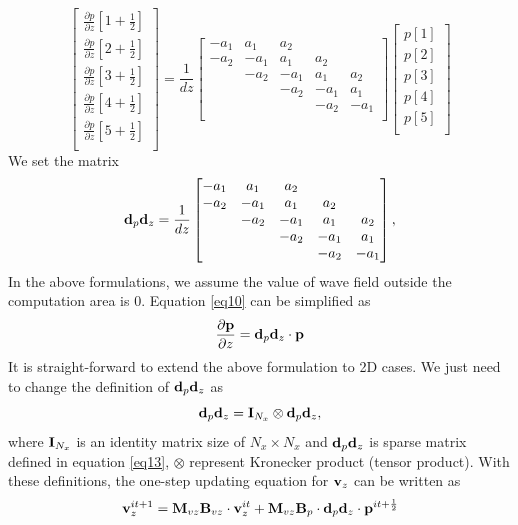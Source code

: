 \documentclass[revised,endfloat]{geophysics}
\begin{document}
\begin{equation}
\begin{bmatrix}
\frac{\partial p}{\partial z}[1+\frac{1}{2}] \\
\frac{\partial p}{\partial z}[2+\frac{1}{2}] \\
\frac{\partial p}{\partial z}[3+\frac{1}{2}] \\
\frac{\partial p}{\partial z}[4+\frac{1}{2}] \\
\frac{\partial p}{\partial z}[5+\frac{1}{2}] \\
\end{bmatrix}
= \frac{1}{dz} \begin{bmatrix}
-a_1 & a_1 & a_2 & & \\
-a_2 & -a_1 & a_1 & a_2 & \\
& -a_2 & -a_1 & a_1 & a_2 \\
& & -a_2 & -a_1 & a_1 \\
& & & -a_2 & -a_1 \\
\end{bmatrix}
\begin{bmatrix}
p[1] \\
p[2] \\
p[3] \\
p[4] \\
p[5] \\
\end{bmatrix}
\label{eq10}
\end{equation}
We set the matrix 
\begin{equation}
{\bf d}_p {\bf d}_z = \frac{1}{dz} \begin{bmatrix}
-a_1 & a_1 & a_2 & & \\
-a_2 & -a_1 & a_1 & a_2 & \\
& -a_2 & -a_1 & a_1 & a_2 \\
& & -a_2 & -a_1 & a_1 \\
& & & -a_2 & -a_1 \\
\end{bmatrix},
\label{eq11}
\end{equation}
In the above formulations, we assume the value of wave field outside the computation area is $0$. Equation \ref{eq10} can be simplified as
\begin{equation}
\frac{\partial {\bf p}}{\partial z} = {\bf d}_p {\bf d}_z \cdot {\bf p}
\label{eq12}
\end{equation}
It is straight-forward to extend the above formulation to 2D cases. We just need to change the definition of ${\bf d}_p{\bf d}_z$ as
\begin{equation}
{\bf d}_p{\bf d}_z = {\bf I}_{N_x} \otimes {\bf d}_p {\bf d}_z, 
\label{eq13}
\end{equation}
where ${\bf I}_{N_x}$ is an identity matrix size of $N_x \times N_x$ and ${\bf d}_p{\bf d}_z$ is sparse matrix defined in equation \ref{eq13}, $\otimes$ represent Kronecker product (tensor product). With these definitions, the one-step updating equation for ${\bf v}_z$ can be written as
\begin{equation}
{\bf v}_z^{it+1} = {\bf M}_{vz}{\bf B}_{vz}  \cdot {\bf v}_z^{it} +  {\bf M}_{vz}{\bf B}_{p} \cdot {\bf d}_p{\bf d}_z \cdot {\bf p}^{it+\frac{1}{2}}
\label{eq14}
\end{equation}
\end{document}
